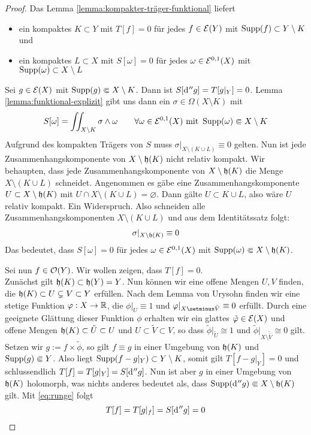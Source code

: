 \begin{proof}
  Das Lemma \ref{lemma:kompakter-träger-funktional} liefert
  \begin{itemize}
  \item ein kompaktes $K \subset Y$ mit $T[f] = 0$ für jedes $f \in
    \mathcal{E}(Y)$ mit $\operatorname{Supp}(f) \subset Y \setminus K$ und
  \item ein kompaktes $L \subset X$ mit $S[\omega] = 0$ für jedes
    $\omega \in \mathcal{E}^{0,1}(X)$ mit $\operatorname{Supp}(\omega) \subset X\setminus L$
  \end{itemize}
   Sei $g \in \mathcal{E}(X)$ mit $\operatorname{Supp}(g) \Subset X \setminus K$. Dann ist
   $S[\d[''g]] = T[g|_Y]  = 0$. Lemma \ref{lemma:funktional-explizit}
   gibt uns dann ein $\sigma \in \Omega(X\setminus K)$ mit
   \[
   S[\omega] = \iint_{X \setminus K}\sigma \wedge \omega \qquad
   \forall \omega \in \mathcal{E}^{0,1}(X) \text{ mit } \operatorname{Supp}(\omega)
   \Subset X\setminus K
   \]
   Aufgrund des kompakten Trägers von $S$ muss $\sigma|_{X \setminus
     (K \cup L)} \equiv 0$ gelten. 
   Nun ist jede Zusammenhangskomponente von $X \setminus \mathfrak{h}(K)$
   nicht relativ kompakt. 
   Wir behaupten, dass jede Zusammenhangskomponente von $X \setminus
   \mathfrak{h}(K)$ die Menge $X \setminus (K \cup L)$ schneidet.
   Angenommen es gäbe eine Zusammenhangskomponente $U \subset X
   \setminus \mathfrak{h}(K)$ mit $U \cap X \setminus ( K \cup L) =
   \varnothing$. Dann gälte $U \subset K \cup L$, also wäre $U$ relativ
   kompakt. Ein Widerspruch. Also schneiden alle
   Zusammenhangskomponenten $X \setminus (K \cup L)$ und aus dem
   Identitätssatz folgt:
   \begin{align}
   \sigma|_{X \setminus \mathfrak{h}(K)} \equiv 0 \label{eq:runge}
   \end{align}
   Das bedeutet, dass $S[\omega] = 0$ für jedes $\omega \in
   \mathcal{E}^{0,1}(X)$ mit $\operatorname{Supp}(\omega) \Subset X \setminus
   \mathfrak{h}(K)$.

   Sei nun $f \in \mathcal{O}(Y)$. Wir wollen zeigen, dass $T[f] = 0$. \\
   Zunächst gilt $\mathfrak{h}(K) \subset \mathfrak{h}(Y) = Y$. Nun können wir
   eine offene Mengen $U, V$ finden, die $ \mathfrak{h}(K) \subset U
   \subsetneq V \subset Y$ erfüllen. Nach dem Lemma von Urysohn finden
   wir eine stetige Funktion $\varphi: X \rightarrow \mathbb{R}$, die $\phi|_U \equiv 1$
   und $\phi|_{X \setminux \bar V} \equiv 0$ erfüllt. Durch eine geeignete Glättung
   dieser Funktion $\phi$ erhalten wir ein glattes $\tilde {\varphi} \in
   \mathcal{E}(X)$ und offene Mengen $\mathfrak{h}(K) \subset \tilde U \subset U$
   und $U \subset \tilde V \subset V$, so dass $\tilde \phi|_{\tilde
     U} \cong 1$ und $\tilde \phi|_{X \setminus \tilde {\bar V}} \cong
   0$ gilt. Setzen wir $ g := f \times \tilde \phi$, so gilt
   $f \equiv g$ in einer Umgebung von $\mathfrak{h}(K)$ und $\operatorname{Supp}(g) \Subset Y$.
   Also liegt $\operatorname{Supp}(f - g|_Y) \subset Y \setminus K$, somit gilt $T[f- g|_Y] = 0$
   und schlussendlich $T[f] = T[g|_Y] = S[\d[''g]]$. 
   Nun ist aber $g$ in einer Umgebung von $\mathfrak{h}(K)$ holomorph, was
   nichts anderes bedeutet als, dass $\Supp(\d[''g]) \Subset X \setminus
   \runge(K)$ gilt.
   Mit \eqref{eq:runge} folgt
   \[
   T[f] = T[g|_f] = S[\d[''g]] = 0
   \]
\end{proof}

